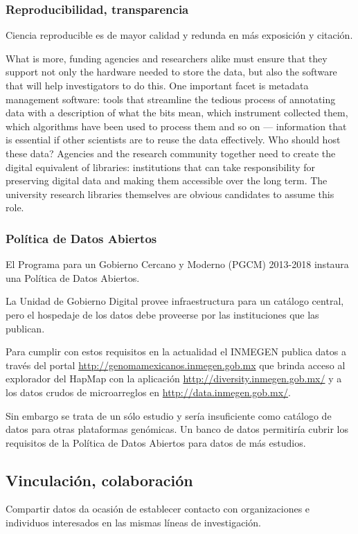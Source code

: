\documentclass[
10pt, %
letterpaper, %
oneside, %
headinclude,footinclude, %
BCOR5mm, %
]{scrartcl}
\begin{document}
\subsubsection{Reproducibilidad, transparencia}
Ciencia reproducible es de mayor calidad y redunda en más exposición y
citación. \cite{piwowar_sharing_2007} \cite{ioannidis}



What is more, funding agencies and researchers alike must ensure that
they support not only the hardware needed to store the data, but also
the software that will help investigators to do this. One important
facet is metadata management software: tools that streamline the
tedious process of annotating data with a description of what the bits
mean, which instrument collected them, which algorithms have been used
to process them and so on — information that is essential if other
scientists are to reuse the data effectively. Who should host these
data? Agencies and the research community together need to create the
digital equivalent of libraries: institutions that can take
responsibility for preserving digital data and making them accessible
over the long term. The university research libraries themselves are
obvious candidates to assume this role.

\subsubsection{Política de Datos Abiertos}
El Programa para un Gobierno Cercano y Moderno (PGCM) 2013-2018
instaura una Política de Datos Abiertos.

La Unidad de Gobierno Digital provee infraestructura para un catálogo
central, pero el hospedaje de los datos debe proveerse por las
instituciones que las publican.

Para cumplir con estos requisitos en la actualidad el INMEGEN publica
datos a través del portal \url{http://genomamexicanos.inmegen.gob.mx} que
brinda acceso al explorador del HapMap con la aplicación
\url{http://diversity.inmegen.gob.mx/} y a los datos crudos de microarreglos
en \url{http://data.inmegen.gob.mx/}.

Sin embargo se trata de un sólo estudio y sería insuficiente como
catálogo de datos para otras plataformas genómicas. Un banco de datos
permitiría cubrir los requisitos de la Política de Datos Abiertos para
datos de más estudios.


\subsection{Vinculación, colaboración}
Compartir datos da ocasión de establecer contacto con organizaciones e
individuos interesados en las mismas líneas de investigación.
\end{document}
